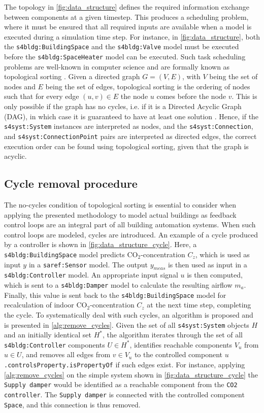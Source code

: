The topology in \autoref{fig:data_structure} defines the required information exchange between components at a given timestep. This produces a scheduling problem, where it must be ensured that all required inputs are available when a model is executed during a simulation time step. For instance, in \autoref{fig:data_structure}, both the \texttt{s4bldg:BuildingSpace} and the \texttt{s4bldg:Valve} model must be executed before the \texttt{s4bldg:SpaceHeater} model can be executed. Such task scheduling problems are well-known in computer science and are formally known as topological sorting \cite{Pang2015}. Given a directed graph $G=(V,E)$, with $V$ being the set of nodes and $E$ being the set of edges, topological sorting is the ordering of nodes such that for every edge $(u,v) \in E$ the node $u$ comes before the node $v$. This is only possible if the graph has no cycles, i.e. if it is a Directed Acyclic Graph (DAG), in which case it is guaranteed to have at least one solution \cite{Pang2015,Renkun2014}. Hence, if the \texttt{s4syst:System} instances are interpreted as nodes, and the \texttt{s4syst:Connection}, and \texttt{s4syst:ConnectionPoint} pairs are interpreted as directed edges, the correct execution order can be found using topological sorting, given that the graph is acyclic. 

\subsection{Cycle removal procedure}
The no-cycles condition of topological sorting is essential to consider when applying the presented methodology to model actual buildings as feedback control loops are an integral part of all building automation systems. When such control loops are modeled, cycles are introduced. An example of a cycle produced by a controller is shown in \autoref{fig:data_structure_cycle}. Here, a \texttt{s4bldg:BuildingSpace} model predicts CO$_2$-concentration $C_z$, which is used as input $y$ in a \texttt{saref:Sensor} model. The output $y_{meas}$ is then used as input in a \texttt{s4bldg:Controller} model. An appropriate input signal $u$ is then computed, which is sent to a \texttt{s4bldg:Damper} model to calculate the resulting airflow $m_a$. Finally, this value is sent back to the \texttt{s4bldg:BuildingSpace} model for recalculation of indoor CO$_2$-concentration $C_z$ at the next time step, completing the cycle. To systematically deal with such cycles, an algorithm is proposed and is presented in \autoref{alg:remove_cycles}. Given the set of all \texttt{s4syst:System} objects $H$ and an initially identical set $H^*$, the algorithm iterates through the set of all \texttt{s4bldg:Controller} components $U \in H^*$, identifies reachable components $V_u$ from $u \in U$, and removes all edges from $v \in V_u$ to the controlled component $u$\texttt{.controlsProperty.isPropertyOf} if such edges exist. For instance, applying \autoref{alg:remove_cycles} on the simple system shown in \autoref{fig:data_structure_cycle} the \texttt{Supply damper} would be identified as a reachable component from the \texttt{CO2 controller}. The \texttt{Supply damper} is connected with the controlled component \texttt{Space}, and this connection is thus removed.


